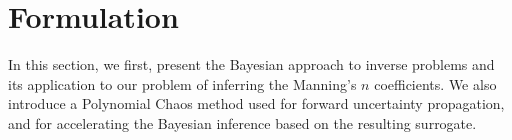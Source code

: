 \section{Formulation}
\label{sec:formu}
In this section, we first, present the Bayesian approach to inverse problems 
and its application to our problem of inferring the Manning's $n$ coefficients.
We also introduce
a Polynomial Chaos method used for forward uncertainty propagation, and 
for accelerating the Bayesian inference based on the resulting surrogate.






